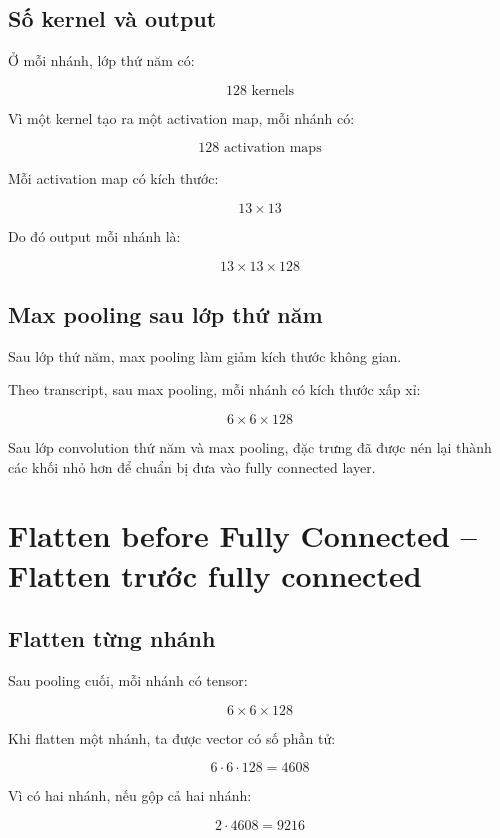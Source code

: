 \subsection{Số kernel và output}

Ở mỗi nhánh, lớp thứ năm có:

\[
    128 \text{ kernels}
\]

Vì một kernel tạo ra một activation map, mỗi nhánh có:

\[
    128 \text{ activation maps}
\]

Mỗi activation map có kích thước:

\[
    13\times13
\]

Do đó output mỗi nhánh là:

\[
    13\times13\times128
\]

\subsection{Max pooling sau lớp thứ năm}

Sau lớp thứ năm, max pooling làm giảm kích thước không gian.

Theo transcript, sau max pooling, mỗi nhánh có kích thước xấp xỉ:

\[
    6\times6\times128
\]

\begin{ghinho}
Sau lớp convolution thứ năm và max pooling, đặc trưng đã được nén lại thành các khối nhỏ hơn để chuẩn bị đưa vào fully connected layer.
\end{ghinho}

\section{Flatten before Fully Connected -- Flatten trước fully connected}

\subsection{Flatten từng nhánh}

Sau pooling cuối, mỗi nhánh có tensor:

\[
    6\times6\times128
\]

Khi flatten một nhánh, ta được vector có số phần tử:

\[
    6\cdot6\cdot128=4608
\]

Vì có hai nhánh, nếu gộp cả hai nhánh:

\[
    2\cdot4608=9216
\]

